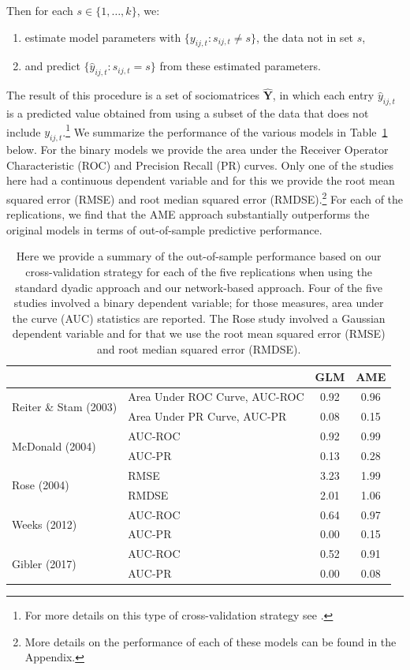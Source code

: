Then for each $s \in \{1,\ldots,k\}$, we:

\begin{enumerate}
	\item estimate model parameters with $\{y_{ij,t}: s_{ij,t} \neq s\}$, the data not in set $s$,
	\item and predict $\{\hat{y}_{ij,t}: s_{ij,t} = s\}$ from these estimated parameters. 
\end{enumerate}

\noindent The result of this procedure is a set of sociomatrices $\bm \hat Y$, in which each entry $\hat y_{ij,t}$ is a predicted value obtained from using a subset of the data that does not include $y_{ij,t}$.\footnote{For more details on this type of cross-validation strategy see \citet{minhas:etal:2016:arxiv}.} We summarize the performance of the various models in Table~\ref{tab:modelPerfSumm} below. For the binary models we  provide the area under the Receiver Operator Characteristic (ROC) and Precision Recall (PR) curves. Only one of the studies here had a continuous dependent variable and for this we provide the root mean squared error (RMSE) and root median squared error (RMDSE).\footnote{More details on the performance of each of these models can be found in the Appendix.} For each of the replications, we find that the AME approach substantially outperforms the original models in terms of out-of-sample predictive performance.

\begin{table}[ht]
\centering
	\begin{tabular}{l|l cc}
	~ & ~ & GLM & AME \\
	\toprule
		\multirow{2}{*}{Reiter \& Stam (2003)} & Area Under ROC Curve, AUC-ROC & 0.92 & {0.96} \\
				~ & Area Under PR Curve, AUC-PR & 0.08 &  {0.15} \\		\midrule
		\multirow{2}{*}{McDonald (2004)} & AUC-ROC & 0.92 &  {0.99} \\
				~ & AUC-PR & 0.13 &  {0.28} \\		\midrule
		\multirow{2}{*}{Rose (2004)} & RMSE & 3.23 &  {1.99} \\
				~ & RMDSE & 2.01 &  {1.06} \\	\midrule
		\multirow{2}{*}{Weeks (2012)} & AUC-ROC & 0.64 &  {0.97} \\
				~ & AUC-PR & 0.00 &  {0.15} \\		\midrule
		\multirow{2}{*}{Gibler (2017)} & AUC-ROC & 0.52 &  {0.91} \\
				~ & AUC-PR & 0.00 &  {0.08} \\			\bottomrule
	\end{tabular}
	\caption{Here we provide a summary of the out-of-sample performance based on our cross-validation strategy for each of the five replications when using the standard dyadic approach and our network-based approach. Four of the five studies involved a binary dependent variable; for those measures, area under the curve (AUC) statistics are reported. The Rose study involved a Gaussian dependent variable and for that we use the root mean squared error (RMSE) and root median squared error (RMDSE). 
	}
	\label{tab:modelPerfSumm}
\end{table}
\FloatBarrier

